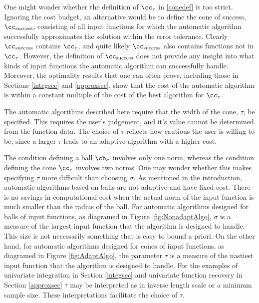 \documentclass[]{elsarticle}
\theoremstyle{definition}
\theoremstyle{remark}
\begin{document}
One might wonder whether the definition of $\cc_{\tau}$ in \eqref{conedef} is too strict.  Ignoring the cost budget, an alternative would be to define the cone of success, $\cc_{\text{success}}$, consisting of all input functions for which the automatic algorithm successfully approximates the solution within the error tolerance.  Clearly $\cc_{\text{success}}$ contains $\cc_{\tau}$, and quite likely $\cc_{\text{success}}$ also contains functions not in $\cc_{\tau}$.  However, the definition of $\cc_{\text{success}}$ does not provide any insight into what kinds of input functions the automatic algorithm can successfully handle.  Moreover, the optimality results that one can often prove, including those in Sections \ref{integsec} and \ref{approxsec}, show that the cost of the automatic algorithm is within a constant multiple of the cost of the best algorithm for $\cc_{\tau}$.

The automatic algorithms described here require that the width of the cone, $\tau$, be specified.  This requires the user's judgement, and it's value cannot be determined from the function data.  The choice of $\tau$ reflects how cautious the user is willing to be, since a larger $\tau$ leads to an adaptive algorithm with a higher cost. 

The condition defining a ball $\cb_{\sigma}$ involves only one norm, whereas the condition defining the cone $\cc_{\tau}$ involves two norms.  One may wonder whether this makes specifying $\tau$ more difficult than choosing $\sigma$.  As mentioned in the introduction, automatic algorithms based on balls are not adaptive and have fixed cost. There is no savings in computational cost when the actual norm of the input function is much smaller than the radius of the ball. For automatic algorithms designed for balls of input functions, as diagramed in Figure \ref{fig:NonadaptAlgo},  $\sigma$ is a measure of the largest input function that the algorithm is designed to handle.  This size is not necessarily something that is easy to bound a priori.  On the other hand, for automatic algorithms designed for cones of input functions, as diagramed in Figure \ref{fig:AdaptAlgo}, the parameter $\tau$ is a measure of the nastiest input function that the algorithm is designed to handle.  For the examples of univariate integration in Section \ref{integsec} and univariate function recovery in Section \ref{approxsec} $\tau$ may be interpreted as in inverse length scale or a minimum sample size. These interpretations facilitate the choice of $\tau$. 
\end{document}
